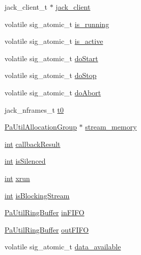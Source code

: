 \begin{DoxyCompactItemize}
jack\+\_\+client\+\_\+t $\ast$ \hyperlink{struct_pa_jack_stream_ac86d61cec117a6ae3daf0005327120b8}{jack\+\_\+client}
\item 
volatile sig\+\_\+atomic\+\_\+t \hyperlink{struct_pa_jack_stream_a06646e9c971d3bb6df4b388069f7b028}{is\+\_\+running}
\item 
volatile sig\+\_\+atomic\+\_\+t \hyperlink{struct_pa_jack_stream_aa76032f188b70106c516f6e899f093c2}{is\+\_\+active}
\item 
volatile sig\+\_\+atomic\+\_\+t \hyperlink{struct_pa_jack_stream_aa9795c7296b5f4980026cc2878d64790}{do\+Start}
\item 
volatile sig\+\_\+atomic\+\_\+t \hyperlink{struct_pa_jack_stream_a2c8bcb554717b9274982084fb5ed0664}{do\+Stop}
\item 
volatile sig\+\_\+atomic\+\_\+t \hyperlink{struct_pa_jack_stream_aead1d117bea0ff3b76f87f3a6ebd60fd}{do\+Abort}
\item 
jack\+\_\+nframes\+\_\+t \hyperlink{struct_pa_jack_stream_ab3acbd1df33dfc6265fa9719c81b549c}{t0}
\item 
\hyperlink{struct_pa_util_allocation_group}{Pa\+Util\+Allocation\+Group} $\ast$ \hyperlink{struct_pa_jack_stream_a06ac71c5889609c10f209e21a85fba0d}{stream\+\_\+memory}
\item 
\hyperlink{xmltok_8h_a5a0d4a5641ce434f1d23533f2b2e6653}{int} \hyperlink{struct_pa_jack_stream_ab747beccc47f95be5295d848f138bd73}{callback\+Result}
\item 
\hyperlink{xmltok_8h_a5a0d4a5641ce434f1d23533f2b2e6653}{int} \hyperlink{struct_pa_jack_stream_acc19c258acb8ac0f67451b3ac17482a9}{is\+Silenced}
\item 
\hyperlink{xmltok_8h_a5a0d4a5641ce434f1d23533f2b2e6653}{int} \hyperlink{struct_pa_jack_stream_ac47c25349767b6d5eaee70792f9dca5f}{xrun}
\item 
\hyperlink{xmltok_8h_a5a0d4a5641ce434f1d23533f2b2e6653}{int} \hyperlink{struct_pa_jack_stream_a82443cba3e6baf5cfe78b117bd0824d1}{is\+Blocking\+Stream}
\item 
\hyperlink{struct_pa_util_ring_buffer}{Pa\+Util\+Ring\+Buffer} \hyperlink{struct_pa_jack_stream_a7eabd09f0955039b4c6e898b67485115}{in\+F\+I\+FO}
\item 
\hyperlink{struct_pa_util_ring_buffer}{Pa\+Util\+Ring\+Buffer} \hyperlink{struct_pa_jack_stream_a8a863fb0eabe0f2d2e12ead03ae1857a}{out\+F\+I\+FO}
\item 
volatile sig\+\_\+atomic\+\_\+t \hyperlink{struct_pa_jack_stream_a821d97c864a8ef77b6ceb221e747019b}{data\+\_\+available}
\item 

\end{DoxyCompactItemize}
